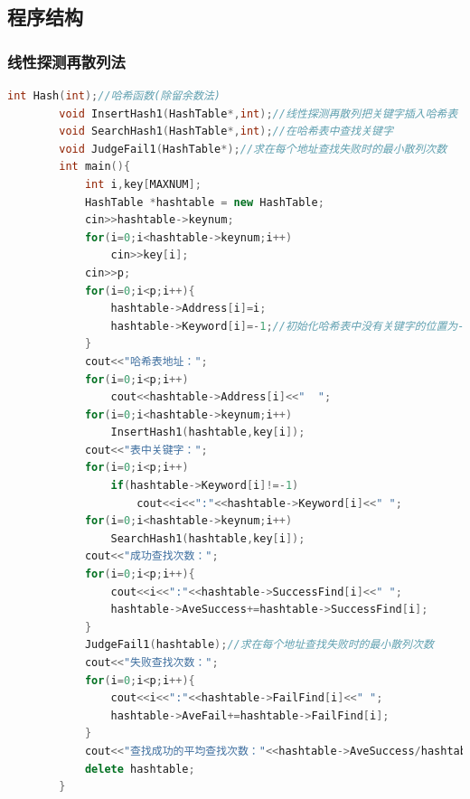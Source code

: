 \documentclass{ctexart}
\begin{document}
	\subsection{程序结构}
	\subsubsection{线性探测再散列法}
	\begin{lstlisting}[language=C++, caption=线性探测再散列法]
		int Hash(int);//哈希函数(除留余数法)
		void InsertHash1(HashTable*,int);//线性探测再散列把关键字插入哈希表
		void SearchHash1(HashTable*,int);//在哈希表中查找关键字
		void JudgeFail1(HashTable*);//求在每个地址查找失败时的最小散列次数
		int main(){
			int i,key[MAXNUM];
			HashTable *hashtable = new HashTable;
			cin>>hashtable->keynum;
			for(i=0;i<hashtable->keynum;i++)
				cin>>key[i];
			cin>>p;
			for(i=0;i<p;i++){
				hashtable->Address[i]=i;
				hashtable->Keyword[i]=-1;//初始化哈希表中没有关键字的位置为-1
			}
			cout<<"哈希表地址：";
			for(i=0;i<p;i++)
				cout<<hashtable->Address[i]<<"  ";
			for(i=0;i<hashtable->keynum;i++)
				InsertHash1(hashtable,key[i]);
			cout<<"表中关键字：";
			for(i=0;i<p;i++)
				if(hashtable->Keyword[i]!=-1)
					cout<<i<<":"<<hashtable->Keyword[i]<<" ";
			for(i=0;i<hashtable->keynum;i++)
				SearchHash1(hashtable,key[i]);
			cout<<"成功查找次数：";
			for(i=0;i<p;i++){
				cout<<i<<":"<<hashtable->SuccessFind[i]<<" ";
				hashtable->AveSuccess+=hashtable->SuccessFind[i];
			}
			JudgeFail1(hashtable);//求在每个地址查找失败时的最小散列次数
			cout<<"失败查找次数：";
			for(i=0;i<p;i++){
				cout<<i<<":"<<hashtable->FailFind[i]<<" ";
				hashtable->AveFail+=hashtable->FailFind[i];
			}
			cout<<"查找成功的平均查找次数："<<hashtable->AveSuccess/hashtable->keynum<<endl<<"查找失败的平均查找次数："<<hashtable->AveFail/p<<endl;
			delete hashtable;
		}
	\end{lstlisting}
\end{document}
